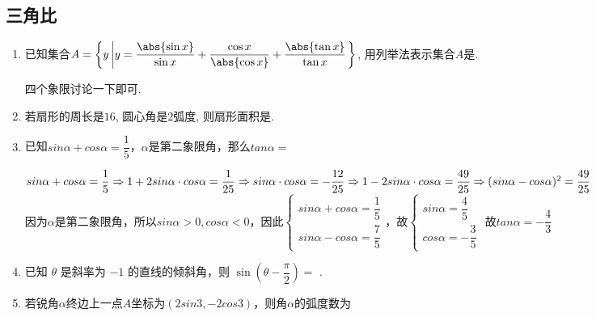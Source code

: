 \subsection*{三角比}
\begin{enumerate}
    \item 已知集合$A=\left\{y \left| y=\dfrac{\abs{\sin{x}}}{\sin{x}}+\dfrac{\cos{x}}{\abs{\cos{x}}}+\dfrac{\abs{\tan{x}}}{\tan{x}}\right.\right\}$, 
    用列举法表示集合$A$是. 
    \begin{jieda}
    四个象限讨论一下即可. 
    \end{jieda}
    \item 若扇形的周长是$16$, 圆心角是$2$弧度, 则扇形面积是.
    \item 已知$sin\alpha + cos\alpha = \dfrac{1}{5}$，$\alpha$是第二象限角，那么$tan\alpha = $
    \begin{jieda}
        $sin\alpha + cos\alpha = \dfrac{1}{5}\\
        \Rightarrow 1 + 2sin\alpha \cdot cos\alpha = \dfrac{1}{25} \Rightarrow sin\alpha \cdot cos\alpha = -\dfrac{12}{25} \Rightarrow 1 - 2sin\alpha \cdot cos\alpha = \dfrac{49}{25} \Rightarrow (sin\alpha - cos\alpha)^2 = \dfrac{49}{25}$ \\
        因为$\alpha$是第二象限角，所以$sin\alpha > 0, cos\alpha < 0$，因此$\left \{ \begin{array}{l}
             sin\alpha + cos\alpha = \dfrac{1}{5}  \\
             sin\alpha - cos\alpha = \dfrac{7}{5}
        \end{array} \right.$，故$\left \{ \begin{array}{l}
             sin\alpha = \dfrac{4}{5}  \\
             cos\alpha = -\dfrac{3}{5}
        \end{array} \right.$
        故$tan\alpha = -\dfrac{4}{3}$
    \end{jieda}
    
    \item 已知 $\theta$ 是斜率为 $-1$ 的直线的倾斜角，则 $\sin \left( {\theta  - \dfrac{\pi }{2}}\right)  =$ .
    
    \item 若锐角$\alpha$终边上一点$A$坐标为$(2sin3, -2cos3)$，则角$\alpha$的弧度数为
    

\end{enumerate}
